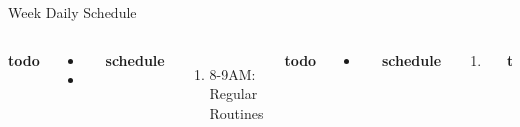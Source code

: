 \documentclass[serif, mathserif, final]{beamer}
\begin{document}
\begin{frame}{}
\begin{columns}
\begin{column}{0.50\linewidth}
  \begin{block}{Week Daily Schedule} 

    \begin{columns} 
      \textbf{\small todo} \\ 
      \begin{itemize}
        \tiny \item \tiny 
      \item \tiny 
      \end{itemize}  
     
  \textbf{\small schedule} \\
  \begin{enumerate} 
    \tiny \item \tiny 8-9AM: Regular Routines 
  \end{enumerate} 

  \textbf{\small todo} \\
  \begin{itemize} 
\tiny \item \tiny 
   \end{itemize}  
  \textbf{\small schedule}\\ 
  \begin{enumerate} 
    \tiny \item \tiny 
  \end{enumerate} 

  \textbf{\small todo} \\
  \begin{itemize} 
    \tiny \item \tiny 
  \end{itemize}  
  \textbf{\small schedule} \\  
  \begin{enumerate} 
    \tiny \item \tiny 8-9AM: Regular Routines 
  \end{enumerate}  

  \textbf{\small todo}\\
  \begin{itemize} 
    \tiny \item \tiny 
  \end{itemize}
  \textbf{\small schedule}\\
  \begin{enumerate} 
    \tiny \item \tiny 8-9AM: Regular Routines 
  \end{enumerate} 


\end{columns}
\end{block}
\end{column}
\end{columns}
\end{frame}
\end{document}
